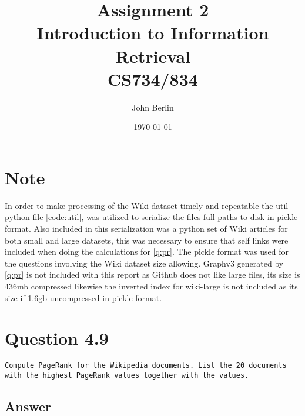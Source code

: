\documentclass[11pt]{article}
\title{Assignment 2 \\ Introduction to Information Retrieval \\ CS734/834}
\author{John Berlin}
\date{\today}
\begin{document}
\maketitle
\newpage
\section*{Note}
In order to make processing of the Wiki dataset timely and repeatable the util python file \autoref{code:util}, was utilized to serialize the files full paths to disk in \href{https://docs.python.org/3/library/pickle.html}{pickle} format. Also included in this serialization was a python set of Wiki articles for both small and large datasets, this was necessary to ensure that self links were included when doing the calculations for \autoref{q:pr}. The pickle format was used for the questions involving the Wiki dataset size allowing. Graphv3 generated by \autoref{q:pr} is not included with this report as Github does not like large files, its size is 436mb compressed likewise the inverted index for wiki-large is not included as its size if 1.6gb uncompressed in pickle format. 
\section{Question 4.9}
\label{q:pr}
\begin{verbatim}
Compute PageRank for the Wikipedia documents. List the 20 documents
with the highest PageRank values together with the values.
\end{verbatim}
\subsection{Answer}
\end{document}
